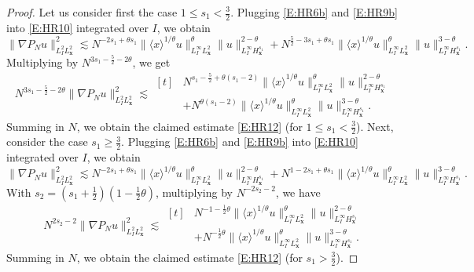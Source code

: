 \documentclass[12pt,letterpaper]{amsart}
\newcommand{\la}{\langle}
\newcommand{\ra}{\rangle}
\theoremstyle{remark}
\numberwithin{equation}{section}
\numberwithin{theorem}{section}
\numberwithin{table}{section}
\begin{document}
\begin{proof}
Let us consider first the case $1\leq s_1 < \frac32$.  Plugging \eqref{E:HR6b} and \eqref{E:HR9b} into \eqref{E:HR10} integrated over $I$, we obtain
$$ 
\| \nabla P_N u \|_{L_I^2L_{\mathbf{x}}^2}^2 \lesssim N^{-2s_1+\theta s_1} 
\|\la x \ra^{1/\theta}  u \|_{L_I^\infty L_{\mathbf{x}}^2}^\theta \| u \|_{L_I^\infty H_{\mathbf{x}}^{s_1}}^{2-\theta}+N^{\frac52-3s_1+\theta s_1}
\| \la x\ra^{1/\theta} u \|_{L_I^\infty L_{\mathbf{x}}^2}^\theta \| u \|_{L_I^\infty H_{\mathbf{x}}^{s_1}}^{3-\theta}.
$$
Multiplying by $N^{3s_1-\frac52-2\theta}$, we get 
$$ 
N^{3s_1-\frac52-2\theta} \| \nabla P_N u \|_{L_I^2L_{\mathbf{x}}^2}^2 \lesssim 
\begin{aligned}[t]
&N^{s_1-\frac52 +\theta (s_1-2)} 
\|\la x \ra^{1/\theta}  u \|_{L_I^\infty L_{\mathbf{x}}^2}^\theta \| u \|_{L_I^\infty H_{\mathbf{x}}^{s_1}}^{2-\theta}\\
&+N^{\theta (s_1-2)} \| \la x\ra^{1/\theta} u \|_{L_I^\infty L_{\mathbf{x}}^2}^\theta \| u \|_{L_I^\infty H_{\mathbf{x}}^{s_1}}^{3-\theta}. 
\end{aligned}
$$
Summing in $N$, we obtain the claimed estimate \eqref{E:HR12} (for $1\leq s_1 < \frac32$).  Next, consider the case $s_1\geq \frac32$.   Plugging \eqref{E:HR6b} and \eqref{E:HR9b} into \eqref{E:HR10} integrated over $I$, we obtain
$$ 
\| \nabla P_N u \|_{L_I^2L_{\mathbf{x}}^2}^2 \lesssim N^{-2s_1+\theta s_1} 
\|\la x \ra^{1/\theta}  u \|_{L_I^\infty L_{\mathbf{x}}^2}^\theta \| u \|_{L_I^\infty H_{\mathbf{x}}^{s_1}}^{2-\theta}+N^{1-2s_1+\theta s_1}
\| \la x\ra^{1/\theta} u \|_{L_I^\infty L_{\mathbf{x}}^2}^\theta \| u \|_{L_I^\infty H_{\mathbf{x}}^{s_1}}^{3-\theta}. 
$$
With $s_2 = (s_1+\frac12)(1-\frac12\theta)$, multiplying by $N^{-2s_2-2}$, we have
$$ 
N^{2s_2-2} \| \nabla P_N u \|_{L_I^2L_{\mathbf{x}}^2}^2 \lesssim 
\begin{aligned}[t]
&N^{-1-\frac12 \theta} 
\|\la x \ra^{1/\theta}  u \|_{L_I^\infty L_{\mathbf{x}}^2}^\theta \| u \|_{L_I^\infty H_{\mathbf{x}}^{s_1}}^{2-\theta}\\
&+N^{-\frac12\theta} \| \la x\ra^{1/\theta} u \|_{L_I^\infty L_{\mathbf{x}}^2}^\theta \| u \|_{L_I^\infty H_{\mathbf{x}}^{s_1}}^{3-\theta}. 
\end{aligned}
$$
Summing in $N$, we obtain the claimed estimate \eqref{E:HR12} (for $s_1>\frac32$).
\end{proof}
\end{document}
